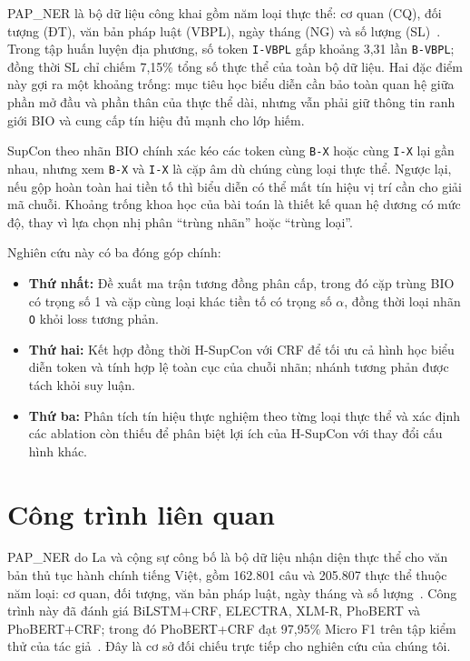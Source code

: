 \documentclass[conference,a4paper]{IEEEtran}
\begin{document}
PAP\_NER là bộ dữ liệu công khai gồm năm loại thực thể: cơ quan (CQ),
đối tượng (ĐT), văn bản pháp luật (VBPL), ngày tháng (NG) và số lượng
(SL)~\cite{la2026papner}. Trong tập huấn luyện địa phương, số token
\texttt{I-VBPL} gấp khoảng 3,31 lần \texttt{B-VBPL}; đồng thời SL chỉ
chiếm 7,15\% tổng số thực thể của toàn bộ dữ liệu. Hai đặc điểm này gợi
ra một khoảng trống: mục tiêu học biểu diễn cần bảo toàn quan hệ giữa
phần mở đầu và phần thân của thực thể dài, nhưng vẫn phải giữ thông tin
ranh giới BIO và cung cấp tín hiệu đủ mạnh cho lớp hiếm.

SupCon theo nhãn BIO chính xác kéo các token cùng \texttt{B-X} hoặc cùng
\texttt{I-X} lại gần nhau, nhưng xem \texttt{B-X} và \texttt{I-X} là
cặp âm dù chúng cùng loại thực thể. Ngược lại, nếu gộp hoàn toàn hai
tiền tố thì biểu diễn có thể mất tín hiệu vị trí cần cho giải mã chuỗi.
Khoảng trống khoa học của bài toán là thiết kế quan hệ dương có mức độ,
thay vì lựa chọn nhị phân ``trùng nhãn'' hoặc ``trùng loại''.

Nghiên cứu này có ba đóng góp chính:
\begin{itemize}
    \item \textbf{Thứ nhất:} Đề xuất ma trận tương đồng phân cấp, trong đó cặp trùng BIO có trọng số 1 và cặp cùng loại khác tiền tố có trọng số $\alpha$, đồng thời loại nhãn \texttt{O} khỏi loss tương phản.

    \item \textbf{Thứ hai:} Kết hợp đồng thời H-SupCon với CRF để tối ưu cả hình học biểu diễn token và tính hợp lệ toàn cục của chuỗi nhãn; nhánh tương phản được tách khỏi suy luận.

    \item \textbf{Thứ ba:} Phân tích tín hiệu thực nghiệm theo từng loại thực thể và xác định các ablation còn thiếu để phân biệt lợi ích của H-SupCon với thay đổi cấu hình khác.
\end{itemize}

\section{Công trình liên quan}\label{sec:related-work}

PAP\_NER do La và cộng sự công bố là bộ dữ liệu nhận diện thực thể
cho văn bản thủ tục hành chính tiếng Việt, gồm 162.801 câu và
205.807 thực thể thuộc năm loại: cơ quan, đối tượng, văn bản pháp luật,
ngày tháng và số lượng~\cite{la2026papner}. Công trình này đã đánh giá BiLSTM+CRF,
ELECTRA, XLM-R, PhoBERT và PhoBERT+CRF; trong đó PhoBERT+CRF đạt
97,95\% Micro F1 trên tập kiểm thử của tác giả~\cite{la2026papner}. Đây là cơ sở
đối chiếu trực tiếp cho nghiên cứu của chúng tôi.
\end{document}
